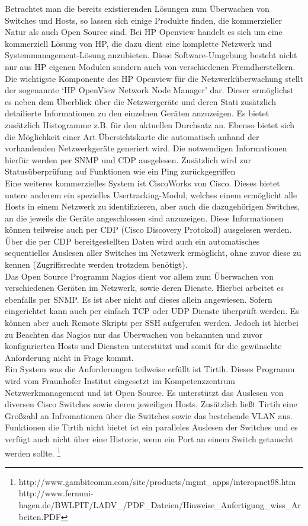 Betrachtet man die bereits existierenden Lösungen zum Überwachen von Switches und Hosts, so lassen sich einige Produkte finden, die kommerzieller Natur als auch Open Source sind.
Bei HP Openview handelt es sich um eine kommerziell Lösung von HP, die dazu dient eine komplette Netzwerk und Systemmanagement-Lösung anzubieten. Diese Software-Umgebung besteht nicht nur aus HP eigenen Modulen sondern auch von verschiedenen Fremdherstellern.
Die wichtigste Komponente des HP Openview für die Netzwerküberwachung stellt der sogenannte ‘HP OpenView Network Node Manager’ dar. Dieser ermöglichst es neben dem Überblick über die Netzwergeräte und deren Stati zusätzlich detailierte Informationen zu den einzelnen Geräten anzuzeigen. Es bietet zusätzlich Histogramme z.B. für den aktuellen Durchsatz an.
Ebenso bietet sich die Möglichkeit einer Art Übersichtskarte die automatisch anhand der vorhandenden Netzwerkgeräte generiert wird. Die notwendigen Informationen hierfür werden per SNMP und CDP ausgelesen. Zusätzlich wird zur Statusüberprüfung auf Funktionen wie ein Ping zurückgegriffen\\
Eine weiteres kommerzielles System ist CiscoWorks von Cisco. Dieses bietet untere anderem ein spezielles Usertracking-Modul, welches einem ermöglicht alle Hosts in einem Netzwerk zu identifizieren, aber auch die dazugehörigen Switches, an die jeweils die Geräte angeschlossen sind anzuzeigen. Diese Informationen können teilweise auch per CDP (Cisco Discovery Protokoll) ausgelesen werden. Über die per CDP bereitgestellten Daten wird auch ein automatisches sequentielles Auslesen aller Switches im Netzwerk ermöglicht, ohne zuvor diese zu kennen (Zugriffsrechte werden trotzdem benötigt).\\
Das Open Source Programm Nagios dient vor allem zum Überwachen von verschiedenen Geräten im Netzwerk, sowie deren Dienste. Hierbei arbeitet es ebenfalls per SNMP. Es ist aber nicht auf dieses allein angewiesen. Sofern eingerichtet kann auch per einfach TCP oder UDP Dienste überprüft werden. Es können aber auch Remote Skripts per SSH aufgerufen werden.
Jedoch ist hierbei zu Beachten das Nagios nur das Überwachen von bekannten und zuvor konfigurierten Hosts und Diensten unterstützt und somit für die gewünschte Anforderung nicht in Frage kommt.\\
Ein System  was die Anforderungen teilweise erfüllt ist Tirtih. Dieses Programm wird vom Fraunhofer Institut eingesetzt im Kompetenzzentrum Netzwerkmanagement und ist Open Source. Es unterstützt das Auslesen von diversen Cisco Switches sowie deren jeweiligen Hosts.
Zusätzlich ließt Tirtih eine Großzahl an Infromationen über die Switches sowie das bestehende VLAN aus. Funktionen die Tirtih nicht bietet ist ein paralleles Auslesen der Switches und es verfügt auch nicht über eine Historie, wenn ein Port an einem Switch getauscht werden sollte.
\footnote{http://www.gambitcomm.com/site/products/mgmt\_apps/interopnet98.htm
http://www.fernuni-hagen.de/BWLPIT/LADV\_/PDF\_Dateien/Hinweise\_Anfertigung\_wiss\_Arbeiten.PDF}

